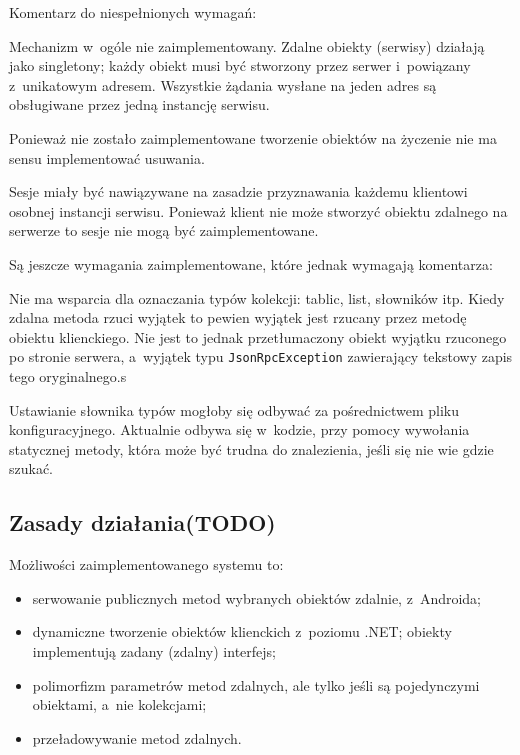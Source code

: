 Komentarz do niespełnionych wymagań:
\begin{description}
Mechanizm w~ogóle nie zaimplementowany. Zdalne obiekty (serwisy) działają jako singletony; każdy obiekt musi być stworzony przez serwer i~powiązany z~unikatowym adresem. Wszystkie żądania wysłane na jeden adres są obsługiwane przez jedną instancję serwisu.

Ponieważ nie zostało zaimplementowane tworzenie obiektów na życzenie nie ma sensu implementować usuwania.

Sesje miały być nawiązywane na zasadzie przyznawania każdemu klientowi osobnej instancji serwisu. Ponieważ klient nie może stworzyć obiektu zdalnego na serwerze to sesje nie mogą być zaimplementowane.
\end{description}

Są jeszcze wymagania zaimplementowane, które jednak wymagają komentarza:
\begin{description}
Nie ma wsparcia dla oznaczania typów kolekcji: tablic, list, słowników itp.
Kiedy zdalna metoda rzuci wyjątek to pewien wyjątek jest rzucany przez metodę obiektu klienckiego. Nie jest to jednak przetłumaczony obiekt wyjątku rzuconego po stronie serwera, a~wyjątek typu \texttt{JsonRpcException} zawierający tekstowy zapis tego oryginalnego.s

Ustawianie słownika typów mogłoby się odbywać za pośrednictwem pliku konfiguracyjnego. Aktualnie odbywa się w~kodzie, przy pomocy wywołania statycznej metody, która może być trudna do znalezienia, jeśli się nie wie gdzie szukać.
\end{description}


\subsection{Zasady działania(TODO)}
Możliwości zaimplementowanego systemu to:
\begin{itemize}
	\item serwowanie publicznych metod wybranych obiektów zdalnie, z~Androida;
	\item dynamiczne tworzenie obiektów klienckich z~poziomu .NET; obiekty implementują zadany (zdalny) interfejs;
	\item polimorfizm parametrów metod zdalnych, ale tylko jeśli są pojedynczymi obiektami, a~nie kolekcjami;
	\item przeładowywanie metod zdalnych.
\end{itemize}


